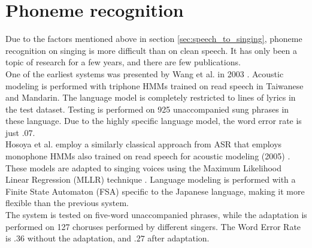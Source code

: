\section{Phoneme recognition} \label{sec:sota_phonerec}
Due to the factors mentioned above in section \ref{sec:speech_to_singing}, phoneme recognition on singing is more difficult than on clean speech. It has only been a topic of research for a few years, and there are few publications.\\
One of the earliest systems was presented by Wang et al. in 2003 \cite{WangLC03}. Acoustic modeling is performed with triphone HMMs trained on read speech in Taiwanese and Mandarin. The language model is completely restricted to lines of lyrics in the test dataset. Testing is performed on 925 unaccompanied sung phrases in these language. Due to the highly specific language model, the word error rate is just $.07$.\\

Hosoya et al. employ a similarly classical approach from ASR that employs monophone HMMs also trained on read speech for acoustic modeling (2005) \cite{Hosoya2005}. These models are adapted to singing voices using the Maximum Likelihood Linear Regression (MLLR) technique \cite{mllr}. Language modeling is performed with a Finite State Automaton (FSA) specific to the Japanese language, making it more flexible than the previous system.\\
The system is tested on five-word unaccompanied phrases, while the adaptation is performed on 127 choruses performed by different singers. The Word Error Rate is $.36$ without the adaptation, and $.27$ after adaptation.\\

